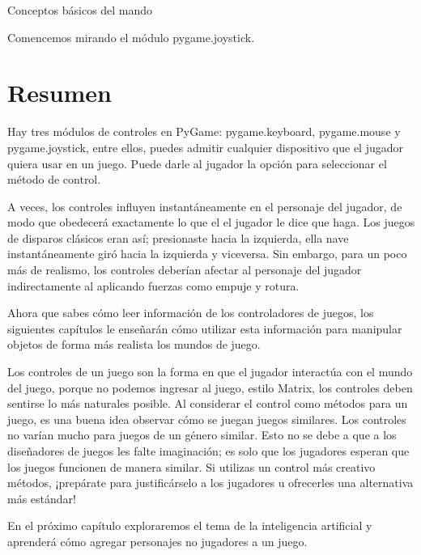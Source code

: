 {Conceptos básicos del mando


Comencemos mirando el módulo pygame.joystick.




\section{Resumen}

Hay tres módulos de controles en PyGame:  {\ttfamily pygame.keyboard},  {\ttfamily pygame.mouse} y  {\ttfamily pygame.joystick}, 
entre ellos, puedes admitir cualquier dispositivo que el jugador quiera usar en un juego.  Puede  darle al jugador la opción para seleccionar el método de control.

A veces, los controles influyen instantáneamente en el personaje del jugador, de modo que obedecerá exactamente lo que el
el jugador le dice que haga. Los juegos de disparos clásicos eran así; presionaste hacia la izquierda, ella nave instantáneamente 
giró hacia la izquierda y viceversa. Sin embargo, para un poco más de realismo, los controles deberían afectar al personaje 
del jugador indirectamente al aplicando fuerzas como empuje y rotura. 

Ahora que sabes cómo leer información de los controladores de juegos, los siguientes capítulos le enseñarán cómo utilizar 
esta información para manipular objetos de forma más realista los mundos de juego.

Los controles de un juego son la forma en que el jugador interactúa con el mundo del juego, porque no podemos
ingresar al juego, estilo Matrix, los controles deben sentirse lo más naturales posible. 
Al considerar el control como métodos para un juego, es una buena idea observar cómo se juegan juegos similares.
Los controles no varían mucho para juegos de un género similar. Esto no se debe a que a los diseñadores de juegos 
les falte imaginación; es solo que los jugadores esperan que los juegos funcionen de manera similar.
Si utilizas un control más creativo métodos, ¡prepárate para justificárselo a los jugadores u ofrecerles una alternativa más estándar!

En el próximo capítulo exploraremos el tema de la inteligencia artificial y aprenderá cómo agregar
personajes no jugadores a un juego.


















}
